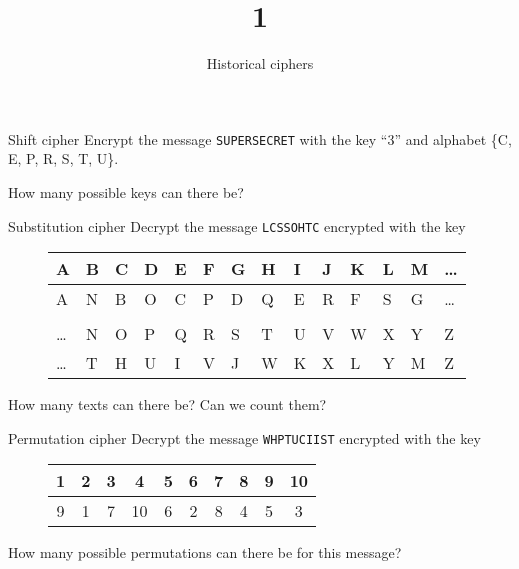 \documentclass{practice}
\title{1}
\subtitle{Historical ciphers}
\date{\DTMdate{2024-09-11}}
\begin{document}
\maketitle

\begin{task}{Shift cipher}
  Encrypt the message \texttt{SUPERSECRET} with the key \enquote{3} and alphabet \{C, E, P, R, S, T, U\}.

  How many possible keys can there be?
\end{task}

\begin{task}{Substitution cipher}
  Decrypt the message \texttt{LCSSOHTC} encrypted with the key
  \begin{figure}[h!]
    \centering
    \begin{tabular}{@{}C{.9em}C{.9em}C{.9em}C{.9em}C{.9em}C{.9em}C{.9em}C{.9em}C{.9em}C{.9em}C{.9em}C{.9em}C{.9em}C{.9em}@{}}
      A & B & C & D & E & F & G & H & I & J & K & L & M & \dots\\\midrule
      A & N & B & O & C & P & D & Q & E & R & F & S & G & \dots\\\\
      \dots & N & O & P & Q & R & S & T & U & V & W & X & Y & Z \\\midrule
      \dots & T & H & U & I & V & J & W & K & X & L & Y & M & Z \par
    \end{tabular}
  \end{figure}
  \vspace*{-1em}

  How many texts can there be? Can we count them?
\end{task}

\begin{task}{Permutation cipher}
  Decrypt the message \texttt{WHPTUCIIST} encrypted with the key
  \begin{figure}[h!]
    \centering
    \begin{tabular}{@{}c c c c c c c c c c@{}}
      1 & 2 & 3 & 4  & 5 & 6 & 7 & 8 & 9 & 10\\\midrule
      9 & 1 & 7 & 10 & 6 & 2 & 8 & 4 & 5 & 3
    \end{tabular}
  \end{figure}
  \vspace*{-1em}

  How many possible permutations can there be for this message?
\end{task}
\end{document}
